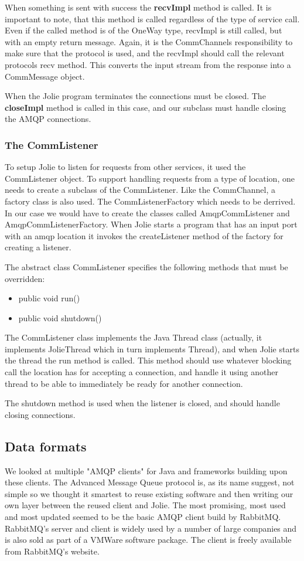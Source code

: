 When something is sent with success the \textbf{recvImpl} method is called. It is important to note, that this method is called regardless of the type of service call. Even if the called method is of the OneWay type, recvImpl is still called, but with an empty return message. Again, it is the CommChannels responsibility to make sure that the protocol is used, and the recvImpl should call the relevant protocols recv method. This converts the input stream from the response into a CommMessage object.

When the Jolie program terminates the connections must be closed. The \textbf{closeImpl} method is called in this case, and our subclass must handle closing the AMQP connections.

\subsubsection{The CommListener}
To setup Jolie to listen for requests from other services, it used the CommListener object. To support handling requests from a type of location, one needs to create a subclass of the CommListener. Like the CommChannel, a factory class is also used. The CommListenerFactory which needs to be derrived. In our case we would have to create the classes called AmqpCommListener and AmqpCommListenerFactory. When Jolie starts a program that has an input port with an amqp location it invokes the createListener method of the factory for creating a listener.

The abstract class CommListener specifies the following methods that must be overridden:
\begin{itemize}
  \item public void run()
  \item public void shutdown()
\end{itemize}

The CommListener class implements the Java Thread class (actually, it implements JolieThread which in turn implements Thread), and when Jolie starts the thread the run method is called. This method should use whatever blocking call the location has for accepting a connection, and handle it using another thread to be able to immediately be ready for another connection.

The shutdown method is used when the listener is closed, and should handle closing connections.

\subsection{Data formats}
\label{subsec:Data formats}
We looked at multiple "AMQP clients" for Java and frameworks building upon these clients. The Advanced Message Queue protocol is, as its name suggest, not simple so we thought it smartest to reuse existing software and then writing our own layer between the reused client and Jolie. The most promising, most used and most updated seemed to be the basic AMQP client build by RabbitMQ\cite{RabbitMqClient}. RabbitMQ's server and client is widely used by a number of large companies and is also sold as part of a VMWare software package\cite{vFabric}. The client is freely available from RabbitMQ's website.

